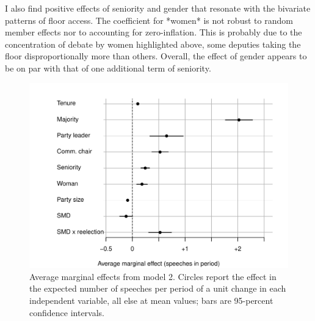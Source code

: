 \documentclass[letter,12pt]{article}
\begin{document}

I also find positive effects of seniority and gender that resonate with the bivariate patterns of floor access. The coefficient for *women* is not robust to random member effects nor to accounting for zero-inflation. This is probably due to the concentration of debate by women highlighted above, some deputies taking the floor disproportionally more than others. Overall, the effect of gender appears to be on par with that of one additional term of seniority. 

\begin{figure}
  \centering
    \includegraphics[width=.67\columnwidth]{../plots/avgMgEffects.pdf}
    \caption{Average marginal effects from model 2. Circles report the effect in the expected number of speeches per period of a unit change in each independent variable, all else at mean values; bars are 95-percent confidence intervals.}\label{F:avgmgeff}
\end{figure}

\end{document}
